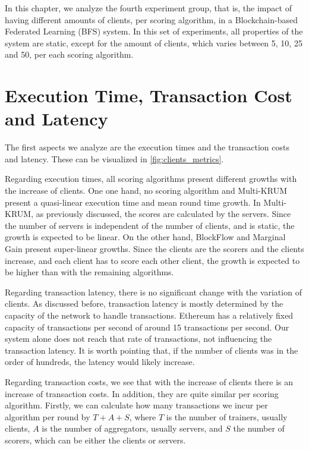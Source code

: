 In this chapter, we analyze the fourth experiment group, that is, the impact of having different amounts of clients, per scoring algorithm, in a Blockchain-based Federated Learning (BFS) system. In this set of experiments, all properties of the system are static, except for the amount of clients, which varies between 5, 10, 25 and 50, per each scoring algorithm.

\section{Execution Time, Transaction Cost and Latency}

The first aspects we analyze are the execution times and the transaction costs and latency. These can be visualized in \autoref{fig:clients_metrics}.

Regarding execution times, all scoring algorithms present different growths with the increase of clients. One one hand, no scoring algorithm and Multi-KRUM present a quasi-linear execution time and mean round time growth. In Multi-KRUM, as previously discussed, the scores are calculated by the servers. Since the number of servers is independent of the number of clients, and is static, the growth is expected to be linear. On the other hand, BlockFlow and Marginal Gain present super-linear growths. Since the clients are the scorers and the clients increase, and each client has to score each other client, the growth is expected to be higher than with the remaining algorithms.

Regarding transaction latency, there is no significant change with the variation of clients. As discussed before, transaction latency is mostly determined by the capacity of the network to handle transactions. Ethereum has a relatively fixed capacity of transactions per second of around 15 transactions per second. Our system alone does not reach that rate of transactions, not influencing the transaction latency. It is worth pointing that, if the number of clients was in the order of hundreds, the latency would likely increase.

Regarding transaction costs, we see that with the increase of clients there is an increase of transaction costs. In addition, they are quite similar per scoring algorithm. Firstly, we can calculate how many transactions we incur per algorithm per round by $T+A+S$, where $T$ is the number of trainers, usually clients, $A$ is the number of aggregators, usually servers, and $S$ the number of scorers, which can be either the clients or servers.

